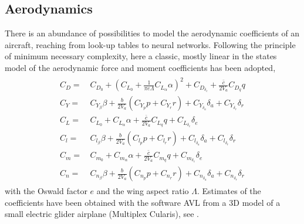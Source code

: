 \documentclass{ifacconf}
\begin{document}
\subsection{Aerodynamics}
There is an abundance of possibilities to model the aerodynamic coefficients of an aircraft, reaching from look-up tables to neural networks. Following the principle of minimum necessary complexity, here a classic, mostly linear in the states model of the aerodynamic force and moment coefficients has been adopted, \cite{Beard2012}
%
\begin{align}
\begin{split}
C_D =&\,C_{D_0} + \left(C_{L_0} + \frac{1}{\pi e \Lambda}C_{L_\alpha}\alpha\right)^2 + C_{D_{\delta_e}} + \frac{\bar{c}}{2V_a}C_{D_{q}}q
\label{eq:aerocoeffcd} \\
C_Y =&\,C_{Y_\beta}\beta + \frac{b}{2V_a} \left( C_{Y_p}p + C_{Y_r}r \right) + C_{Y_{\delta_a}}\delta_a + C_{Y_{\delta_r}}\delta_r\\
C_L =&\,C_{L_0} + C_{L_\alpha}\alpha +\frac{\bar{c}}{2V_a}C_{L_q}q +C_{L_{\delta_e}}\delta_e\\
C_l =&\,C_{l_{\beta}}\beta + \frac{b}{2V_a}\left(C_{l_{p}}p +C_{l_{r}}r\right) +C_{l_{\delta_a}}\delta_a +C_{l_{\delta_r}}\delta_r\\
C_m =&\,C_{m_0} + C_{m_\alpha}\alpha + \frac{\bar{c}}{2V_a}C_{m_q}q + C_{m_{\delta_e}}\delta_e\\
C_n =&\,C_{n_\beta}\beta + \frac{b}{2V_a} \left(C_{n_p}p + C_{n_r}r\right)+ C_{n_{\delta_a}} \! \delta_a+ C_{n_{\delta_r}}\!\delta_r
\end{split}
\end{align}
%
with the Oswald factor $e$ and the wing aspect ratio $\Lambda$. Estimates of the coefficients have been obtained with the software AVL from a 3D model of a small electric glider airplane (Multiplex Cularis), see \cite{StollePhD2016}.
\end{document}
